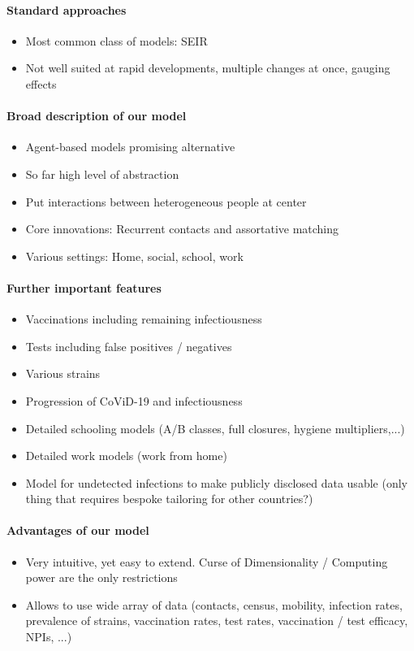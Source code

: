 \paragraph{Standard approaches }
\begin{itemize}
    \item Most common class of models: SEIR
    \item Not well suited at rapid developments, multiple changes at once, gauging effects
\end{itemize}

\paragraph{Broad description of our model}
\begin{itemize}
    \item Agent-based models promising alternative
    \item So far high level of abstraction
    \item Put interactions between heterogeneous people at center
    \item Core innovations: Recurrent contacts and assortative matching
    \item Various settings: Home, social, school, work
\end{itemize}

\paragraph{Further important features }
\begin{itemize}
    \item Vaccinations including remaining infectiousness
    \item Tests including false positives / negatives
    \item Various strains
    \item Progression of CoViD-19 and infectiousness
    \item Detailed schooling models (A/B classes, full closures, hygiene multipliers,...)
    \item Detailed work models (work from home)
    \item Model for undetected infections to make publicly disclosed data usable (only thing that requires bespoke tailoring for other countries?)
\end{itemize}

\paragraph{Advantages of our model}
\begin{itemize}
    \item Very intuitive, yet easy to extend. Curse of Dimensionality / Computing power are the only restrictions
    \item Allows to use wide array of data (contacts, census, mobility, infection rates, prevalence of strains, vaccination rates, test rates, vaccination / test efficacy, NPIs, ...)
\end{itemize}    

